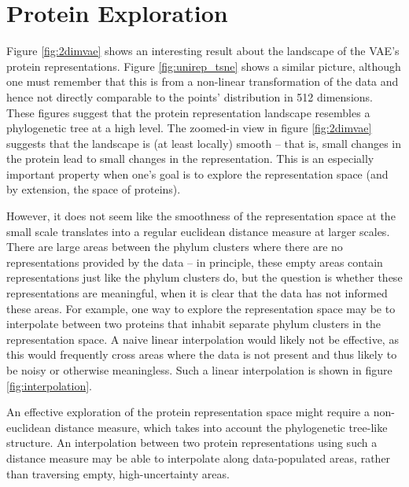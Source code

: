 \section{Protein Exploration}
\label{sec:protein_exploration}
Figure \ref{fig:2dimvae} shows an interesting result about the landscape of the VAE's protein representations. Figure \ref{fig:unirep_tsne} shows a similar picture, although one must remember that this is from a non-linear transformation of the data and hence not directly comparable to the points' distribution in 512 dimensions. These figures suggest that the protein representation landscape resembles a phylogenetic tree at a high level. The zoomed-in view in figure \ref{fig:2dimvae} suggests that the landscape is (at least locally) smooth -- that is, small changes in the protein lead to small changes in the representation. This is an especially important property when one's goal is to explore the representation space (and by extension, the space of proteins).

However, it does not seem like the smoothness of the representation space at the small scale translates into a regular euclidean distance measure at larger scales. There are large areas between the phylum clusters where there are no representations provided by the data -- in principle, these empty areas contain representations just like the phylum clusters do, but the question is whether these representations are meaningful, when it is clear that the data has not informed these areas. For example, one way to explore the representation space may be to interpolate between two proteins that inhabit separate phylum clusters in the representation space. A naive linear interpolation would likely not be effective, as this would frequently cross areas where the data is not present and thus likely to be noisy or otherwise meaningless. Such a linear interpolation is shown in figure \ref{fig:interpolation}.

An effective exploration of the protein representation space might require a non-euclidean distance measure, which takes into account the phylogenetic tree-like structure. An interpolation between two protein representations using such a distance measure may be able to interpolate along data-populated areas, rather than traversing empty, high-uncertainty areas.





